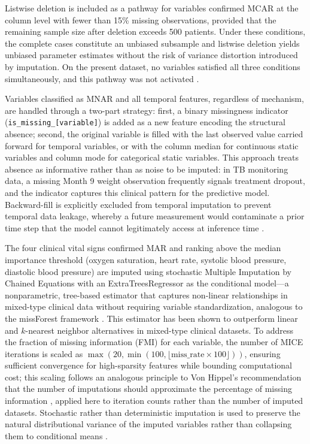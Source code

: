 \documentclass[12pt]{article}
\begin{document}
Listwise deletion is included as a pathway for variables confirmed MCAR at the column level with fewer than 15\% missing observations, provided that the remaining sample size after deletion exceeds 500 patients. Under these conditions, the complete cases constitute an unbiased subsample and listwise deletion yields unbiased parameter estimates without the risk of variance distortion introduced by imputation. On the present dataset, no variables satisfied all three conditions simultaneously, and this pathway was not activated \citep{ref32}.

Variables classified as MNAR and all temporal features, regardless of mechanism, are handled through a two-part strategy: first, a binary missingness indicator (\texttt{is\_missing\_[variable]}) is added as a new feature encoding the structural absence; second, the original variable is filled with the last observed value carried forward for temporal variables, or with the column median for continuous static variables and column mode for categorical static variables. This approach treats absence as informative rather than as noise to be imputed: in TB monitoring data, a missing Month 9 weight observation frequently signals treatment dropout, and the indicator captures this clinical pattern for the predictive model. Backward-fill is explicitly excluded from temporal imputation to prevent temporal data leakage, whereby a future measurement would contaminate a prior time step that the model cannot legitimately access at inference time \citep{ref34, ref36, ref33}.

The four clinical vital signs confirmed MAR and ranking above the median importance threshold (oxygen saturation, heart rate, systolic blood pressure, diastolic blood pressure) are imputed using stochastic Multiple Imputation by Chained Equations with an ExtraTreesRegressor as the conditional model---a nonparametric, tree-based estimator that captures non-linear relationships in mixed-type clinical data without requiring variable standardization, analogous to the missForest framework \citep{ref35}. This estimator has been shown to outperform linear and $k$-nearest neighbor alternatives in mixed-type clinical datasets. To address the fraction of missing information (FMI) for each variable, the number of MICE iterations is scaled as $\max(20, \min(100, \lfloor \text{miss\_rate} \times 100 \rfloor))$, ensuring sufficient convergence for high-sparsity features while bounding computational cost; this scaling follows an analogous principle to Von Hippel's recommendation that the number of imputations should approximate the percentage of missing information \citep{ref38}, applied here to iteration counts rather than the number of imputed datasets. Stochastic rather than deterministic imputation is used to preserve the natural distributional variance of the imputed variables rather than collapsing them to conditional means \citep{ref1}.
\end{document}
